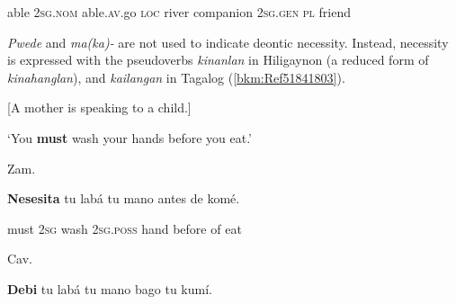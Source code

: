 \begin{stylelsIMT}
able 2\textsc{sg.nom} able.\textsc{av}.go \textsc{loc} river companion 2\textsc{sg.gen pl} friend
\end{stylelsIMT}

\begin{stylelsLanginfo}
\textit{Pwede} and \textit{ma(ka)-} are not used to indicate deontic necessity. Instead, necessity is expressed with the pseudoverbs \textit{kinanlan} in Hiligaynon (a reduced form of \textit{kinahanglan}), and \textit{kailangan} in Tagalog (\ref{bkm:Ref51841803}).
\end{stylelsLanginfo}

\begin{listWWNumiileveli}
\item 
\begin{stylelsLanginfo}
\label{bkm:Ref51841803}[A mother is speaking to a child.]
\end{stylelsLanginfo}
\end{listWWNumiileveli}
\begin{stylelsLanginfo}
‘You \textbf{must} wash your hands before you eat.’
\end{stylelsLanginfo}

\begin{listWWNumiileveli}
\item 
\begin{listWWNumiilevelii}
\item 
\begin{stylelsLanginfo}
Zam.
\end{stylelsLanginfo}
\end{listWWNumiilevelii}
\end{listWWNumiileveli}
\begin{stylelsSourceline}
\textbf{Nesesita} tu labá tu mano antes de komé.
\end{stylelsSourceline}

\begin{stylelsIMT}
must 2\textsc{sg} wash 2\textsc{sg}.\textsc{poss} hand before of eat
\end{stylelsIMT}

\begin{listWWNumiileveli}
\item 
\begin{listWWNumiilevelii}
\item 
\begin{stylelsLanginfo}
Cav.
\end{stylelsLanginfo}
\end{listWWNumiilevelii}
\end{listWWNumiileveli}
\begin{stylelsSourceline}
\textbf{Debi} tu labá tu mano bago tu kumí.
\end{stylelsSourceline}

